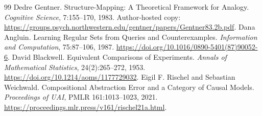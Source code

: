 \documentclass[11pt,letterpaper]{article}
\theoremstyle{plain}
\theoremstyle{definition}
\begin{document}
\begin{thebibliography}{99}
 Dedre Gentner. Structure-Mapping: A Theoretical Framework for Analogy. \emph{Cognitive Science}, 7:155--170, 1983. Author-hosted copy: \url{https://groups.psych.northwestern.edu/gentner/papers/Gentner83.2b.pdf}.
 Dana Angluin. Learning Regular Sets from Queries and Counterexamples. \emph{Information and Computation}, 75:87--106, 1987. \url{https://doi.org/10.1016/0890-5401(87)90052-6}.
 David Blackwell. Equivalent Comparisons of Experiments. \emph{Annals of Mathematical Statistics}, 24(2):265--272, 1953. \url{https://doi.org/10.1214/aoms/1177729032}.
 Eigil F. Rischel and Sebastian Weichwald. Compositional Abstraction Error and a Category of Causal Models. \emph{Proceedings of UAI}, PMLR 161:1013--1023, 2021. \url{https://proceedings.mlr.press/v161/rischel21a.html}.
\end{thebibliography}
\end{document}
